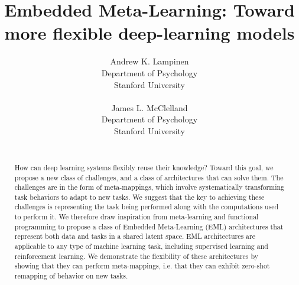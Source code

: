 \documentclass{article}
\begin{document}
\title{Embedded Meta-Learning: Toward more flexible deep-learning models}
\author{%
Andrew K. Lampinen\\
Department of Psychology\\
Stanford University\\
\\
\And
James L. McClelland\\
Department of Psychology\\
Stanford University\\
\\
}
\date{}
\maketitle

\begin{abstract}
How can deep learning systems flexibly reuse their knowledge? Toward this goal, we propose a new class of challenges, and a class of architectures that can solve them. The challenges are in the form of meta-mappings, which involve systematically transforming task behaviors to adapt to new tasks. We suggest that the key to achieving these challenges is representing the task being performed along with the computations used to perform it. We therefore draw inspiration from meta-learning and functional programming to propose a class of Embedded Meta-Learning (EML) architectures that represent both data and tasks in a shared latent space. EML architectures are applicable to any type of machine learning task, including supervised learning and reinforcement learning. We demonstrate the flexibility of these architectures by showing that they can perform meta-mappings, i.e. that they can exhibit zero-shot remapping of behavior on new tasks. 
\end{abstract}
\end{document}
